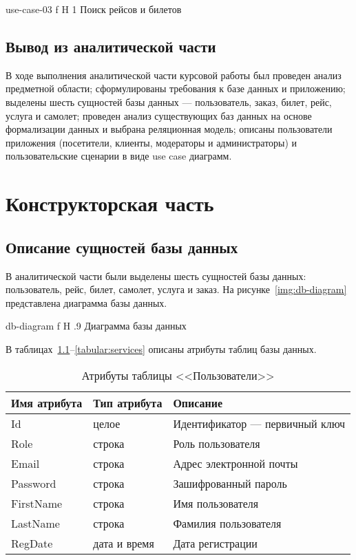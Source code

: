 \documentclass{bmstu}
\begin{document}
    {use-case-03}
    {f}
    {H}
    {1\textwidth}
    {Поиск рейсов и билетов}

\section*{Вывод из аналитической части}

В ходе выполнения аналитической части курсовой работы был проведен анализ предметной области; сформулированы требования к базе данных и приложению; выделены шесть сущностей базы данных --- пользователь, заказ, билет, рейс, услуга и самолет; проведен анализ существующих баз данных на основе формализации данных и выбрана реляционная модель; описаны пользователи приложения (посетители, клиенты, модераторы и администраторы) и пользовательские сценарии в виде use case диаграмм.

\chapter{Конструкторская часть}

\section{Описание сущностей базы данных}

В аналитической части были выделены шесть сущностей базы данных: пользователь, рейс, билет, самолет, услуга и заказ. 
На рисунке~\ref{img:db-diagram} представлена диаграмма базы данных.

    {db-diagram}
    {f}
    {H}
    {.9\textwidth}
    {Диаграмма базы данных}

В таблицах~\ref{tabular:users}--\ref{tabular:services} описаны атрибуты таблиц базы данных.

\begin{table}[H]
\caption{Атрибуты таблицы <<Пользователи>>}
\label{tabular:users}
\begin{tabular}{|>{\raggedleft}p{4cm}|>{\raggedleft}p{3cm}|>{\raggedleft}p{8cm}|}
\hline
\textbf{Имя атрибута} & \textbf{Тип атрибута} & \textbf{Описание}
\tabularnewline
\hline
Id & целое & Идентификатор --- первичный ключ
\tabularnewline
\hline
Role & строка & Роль пользователя
\tabularnewline
\hline
Email & строка & Адрес электронной почты
\tabularnewline
\hline
Password & строка & Зашифрованный пароль
\tabularnewline
\hline
FirstName & строка & Имя пользователя
\tabularnewline
\hline
LastName & строка & Фамилия пользователя
\tabularnewline
\hline
RegDate & дата и время & Дата регистрации
\tabularnewline
\hline
\end{tabular}
\end{table}
\end{document}
